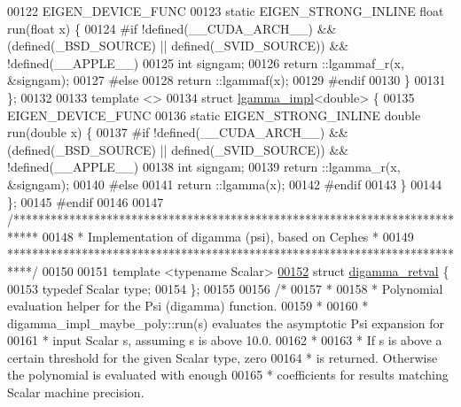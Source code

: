 \begin{DoxyCode}
00122   EIGEN\_DEVICE\_FUNC
00123   \textcolor{keyword}{static} EIGEN\_STRONG\_INLINE \textcolor{keywordtype}{float} run(\textcolor{keywordtype}{float} x) \{
00124 \textcolor{preprocessor}{#if !defined(\_\_CUDA\_ARCH\_\_) && (defined(\_BSD\_SOURCE) || defined(\_SVID\_SOURCE)) && !defined(\_\_APPLE\_\_)}
00125     \textcolor{keywordtype}{int} signgam;
00126     return ::lgammaf\_r(x, &signgam);
00127 \textcolor{preprocessor}{#else}
00128     return ::lgammaf(x);
00129 \textcolor{preprocessor}{#endif}
00130   \}
00131 \};
00132 
00133 \textcolor{keyword}{template} <>
00134 \textcolor{keyword}{struct }\hyperlink{struct_eigen_1_1internal_1_1lgamma__impl}{lgamma\_impl}<double> \{
00135   EIGEN\_DEVICE\_FUNC
00136   \textcolor{keyword}{static} EIGEN\_STRONG\_INLINE \textcolor{keywordtype}{double} run(\textcolor{keywordtype}{double} x) \{
00137 \textcolor{preprocessor}{#if !defined(\_\_CUDA\_ARCH\_\_) && (defined(\_BSD\_SOURCE) || defined(\_SVID\_SOURCE)) && !defined(\_\_APPLE\_\_)}
00138     \textcolor{keywordtype}{int} signgam;
00139     return ::lgamma\_r(x, &signgam);
00140 \textcolor{preprocessor}{#else}
00141     return ::lgamma(x);
00142 \textcolor{preprocessor}{#endif}
00143   \}
00144 \};
00145 \textcolor{preprocessor}{#endif}
00146 
00147 \textcolor{comment}{/****************************************************************************}
00148 \textcolor{comment}{ * Implementation of digamma (psi), based on Cephes                         *}
00149 \textcolor{comment}{ ****************************************************************************/}
00150 
00151 \textcolor{keyword}{template} <\textcolor{keyword}{typename} Scalar>
\hyperlink{struct_eigen_1_1internal_1_1digamma__retval}{00152} \textcolor{keyword}{struct }\hyperlink{struct_eigen_1_1internal_1_1digamma__retval}{digamma\_retval} \{
00153   \textcolor{keyword}{typedef} Scalar type;
00154 \};
00155 
00156 \textcolor{comment}{/*}
00157 \textcolor{comment}{ *}
00158 \textcolor{comment}{ * Polynomial evaluation helper for the Psi (digamma) function.}
00159 \textcolor{comment}{ *}
00160 \textcolor{comment}{ * digamma\_impl\_maybe\_poly::run(s) evaluates the asymptotic Psi expansion for}
00161 \textcolor{comment}{ * input Scalar s, assuming s is above 10.0.}
00162 \textcolor{comment}{ *}
00163 \textcolor{comment}{ * If s is above a certain threshold for the given Scalar type, zero}
00164 \textcolor{comment}{ * is returned.  Otherwise the polynomial is evaluated with enough}
00165 \textcolor{comment}{ * coefficients for results matching Scalar machine precision.}

\end{DoxyCode}
